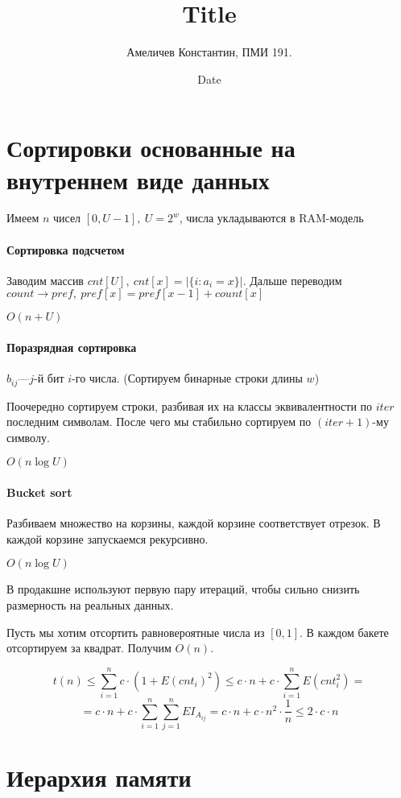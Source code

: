 \documentclass[12pt]{article}
\title{Title}
\author{Амеличев Константин, ПМИ 191.}
\date{Date}
\newcommand{\rangesum}[2]{\displaystyle \sum_{#1}^{#2}}
\begin{document}
\section{Сортировки основанные на внутреннем виде данных}

Имеем $n$ чисел $[0, U - 1],\ U = 2^w$, числа укладываются в RAM-модель

\paragraph{Сортировка подсчетом}

Заводим массив $cnt[U],\ cnt[x] = |\{i : a_i = x\}|$. Дальше переводим $count \rightarrow pref,\ pref[x] = pref[x - 1] + count[x]$

$O(n + U)$

\paragraph{Поразрядная сортировка}

$b_{ij}$---$j$-й бит $i$-го числа. (Сортируем бинарные строки длины $w$)

Поочередно сортируем строки, разбивая их на классы эквивалентности по $iter$ последним символам. После чего мы стабильно сортируем по $(iter+1)$-му символу. 

$O(n \log U)$

\paragraph{Bucket sort}

Разбиваем множество на корзины, каждой корзине соответствует отрезок. В каждой корзине запускаемся рекурсивно. 

$O(n \log U)$

В продакшне используют первую пару итераций, чтобы сильно снизить размерность на реальных данных.

Пусть мы хотим отсортить равновероятные числа из  $[0, 1]$. В каждом бакете отсортируем за квадрат. Получим $O(n)$. 

$$t(n) \le \rangesum{i=1}{n} c \cdot (1 + E (cnt_i)^2) \le c \cdot n + c \cdot \rangesum{i=1}{n} E (cnt_i^2) = $$
$$ = c \cdot n + c \cdot \rangesum{i=1}{n} \rangesum{j=1}{n} E I_{A_{ij}} = c \cdot n + c \cdot n^2 \cdot \frac{1}{n} \le 2 \cdot c \cdot n$$

\section{Иерархия памяти}
\end{document}

